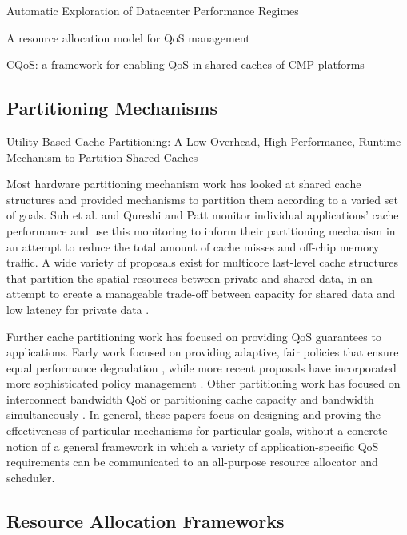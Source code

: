 Automatic Exploration of Datacenter Performance Regimes
\cite{bodik-acdc09}

A resource allocation model for QoS management
\cite{828990}

CQoS: a framework for enabling QoS in shared caches of CMP platforms
\cite{1006246}

\subsection{Partitioning Mechanisms}
\label{sec:rel:pm}

Utility-Based Cache Partitioning: A Low-Overhead, High-Performance, Runtime Mechanism to Partition Shared Caches
\cite{1194855}

Most hardware partitioning mechanism work has looked at shared cache structures and provided mechanisms to partition them according to a varied set of goals.  Suh et al. \cite{876484, 967444} and Qureshi and Patt \cite{1194855} monitor individual applications' cache performance and use this monitoring to inform their partitioning mechanism in an attempt to reduce the total amount of cache misses and off-chip memory traffic. A wide variety of proposals exist for multicore last-level cache structures that partition the spatial resources between private and shared data, in an attempt to create a manageable trade-off between capacity for shared data and low latency for private data \cite{1275005,1194858,1318096,1088154,1399973,1069998,1399982}.

Further cache partitioning work has focused on providing QoS guarantees to applications. Early work focused on providing adaptive, fair policies that ensure equal performance degradation \cite{605420,1086328}, while more recent proposals have incorporated more sophisticated policy management \cite{1241608,1331730,1152161,1254886}. Other partitioning work has focused on interconnect bandwidth QoS \cite{1382130} or partitioning cache capacity and bandwidth simultaneously \cite{1250671}. In general, these papers focus on designing and proving the effectiveness of particular mechanisms for particular goals, without a concrete notion of a general framework in which a variety of application-specific QoS requirements can be communicated to an all-purpose resource allocator and scheduler.

\subsection{Resource Allocation Frameworks}

